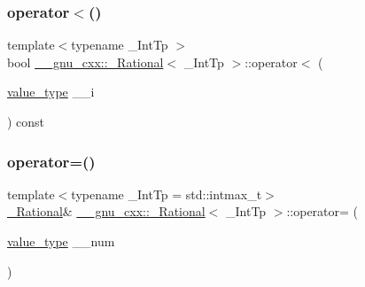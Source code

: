 \subsubsection{\texorpdfstring{operator$<$()}{operator<()}\hspace{0.1cm}{\footnotesize\ttfamily [2/2]}}
{\footnotesize\ttfamily template$<$typename \+\_\+\+Int\+Tp $>$ \\
bool \hyperlink{class____gnu__cxx_1_1__Rational}{\+\_\+\+\_\+gnu\+\_\+cxx\+::\+\_\+\+Rational}$<$ \+\_\+\+Int\+Tp $>$\+::operator$<$ (\begin{DoxyParamCaption}\item[{\hyperlink{class____gnu__cxx_1_1__Rational_a7987be70fc59d0d980621fd65828b74a}{value\+\_\+type}}]{\+\_\+\+\_\+i }\end{DoxyParamCaption}) const}

\mbox{\label{class____gnu__cxx_1_1__Rational_a600b977ae120e47f45d72cd9353fccb5}} 
\subsubsection{\texorpdfstring{operator=()}{operator=()}}
{\footnotesize\ttfamily template$<$typename \+\_\+\+Int\+Tp = std\+::intmax\+\_\+t$>$ \\
\hyperlink{class____gnu__cxx_1_1__Rational}{\+\_\+\+Rational}\& \hyperlink{class____gnu__cxx_1_1__Rational}{\+\_\+\+\_\+gnu\+\_\+cxx\+::\+\_\+\+Rational}$<$ \+\_\+\+Int\+Tp $>$\+::operator= (\begin{DoxyParamCaption}\item[{\hyperlink{class____gnu__cxx_1_1__Rational_a7987be70fc59d0d980621fd65828b74a}{value\+\_\+type}}]{\+\_\+\+\_\+num }\end{DoxyParamCaption})\hspace{0.3cm}{\ttfamily [inline]}}

\mbox{\label{class____gnu__cxx_1_1__Rational_a7cfe2368fdb19305ca4d7b2eedcd90a4}} 
